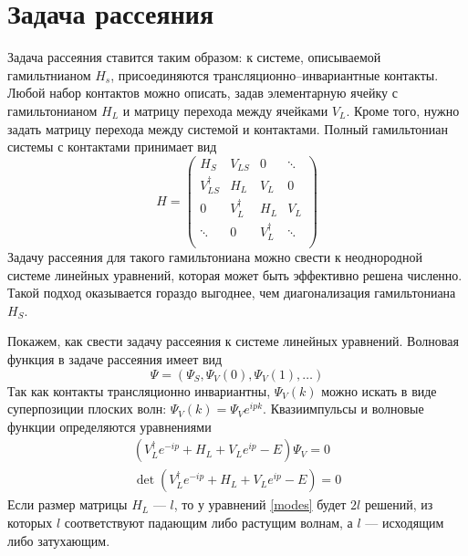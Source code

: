 \section{Задача рассеяния}
Задача рассеяния ставится таким образом:
к системе, описываемой гамильтнианом $H_s$, присоединяются трансляционно--инвариантные 
контакты. Любой набор контактов можно описать, задав элементарную ячейку с гамильтонианом 
$H_L$ и матрицу перехода между ячейками $V_L$. Кроме того, нужно задать матрицу перехода
между системой и контактами. Полный гамильтониан системы с контактами
принимает вид
\begin{equation}
    H = \begin{pmatrix}
            H_S             & V_{LS}     & 0           & \ddots \\
            V_{LS}^\dagger  & H_L        & V_L         & 0  \\
            0               & V_L^\dagger& H_L         & V_L    \\
            \ddots          & 0          & V_L^\dagger & \ddots \\
        \end{pmatrix}
\end{equation}
Задачу рассеяния для такого гамильтониана можно свести к неоднородной системе линейных 
уравнений, которая может быть эффективно решена численно. Такой подход оказывается 
гораздо выгоднее, чем диагонализация гамильтониана $H_S$. 

Покажем, как свести задачу рассеяния к системе линейных уравнений. 
Волновая функция в задаче рассеяния имеет вид 
\begin{equation}
    \Psi = (\Psi_S, \Psi_V(0), \Psi_V(1), \dots)
\end{equation}
Так как контакты трансляционно инвариантны, $\Psi_V(k)$ можно искать в виде суперпозиции
плоских волн: $\Psi_V(k) = \Psi_V e^{ipk}$. Квазиимпульсы и волновые функции определяются 
уравнениями
\begin{equation}
    \label{modes}
    \begin{gathered}
        (V_L^\dagger e^{-ip} + H_L + V_L e^{ip} - E) \Psi_V = 0\\
        \det{(V_L^\dagger e^{-ip} + H_L + V_L e^{ip} - E)} = 0
    \end{gathered}
\end{equation}
Если размер матрицы $H_L$ --- $l$, то у уравнений \eqref{modes} будет $2l$ решений, из 
которых $l$ соответствуют падающим либо растущим волнам, а $l$ --- исходящим либо 
затухающим.

